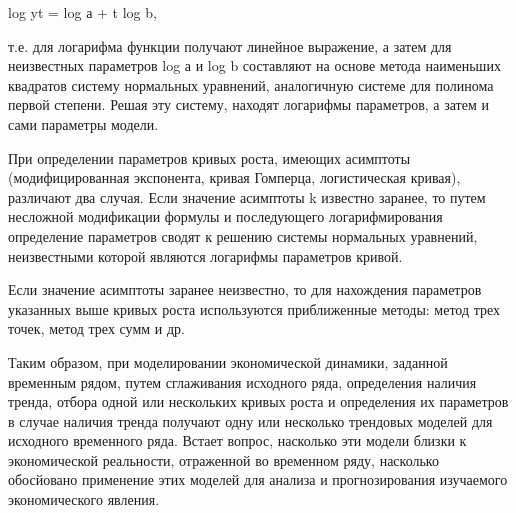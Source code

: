 log yt = log а + t log b,

т.е. для логарифма функции получают линейное выражение, а затем для неизвестных параметров log а и log b составляют на основе метода наименьших квадратов систему нормальных уравнений, аналогичную системе для полинома первой степени. Решая эту систему, находят логарифмы параметров, а затем и сами параметры модели.

При определении параметров кривых роста, имеющих асимптоты (модифицированная экспонента, кривая Гомперца, логистическая кривая), различают два случая. Если значение асимптоты k известно заранее, то путем несложной модификации формулы и последующего логарифмирования определение параметров сводят к решению системы нормальных уравнений, неизвестными которой являются логарифмы параметров кривой.

Если значение асимптоты заранее неизвестно, то для нахождения параметров указанных выше кривых роста используются приближенные методы: метод трех точек, метод трех сумм и др.

Таким образом, при моделировании экономической динамики, заданной временным рядом, путем сглаживания исходного ряда, определения наличия тренда, отбора одной или нескольких кривых роста и определения их параметров в случае наличия тренда получают одну или несколько трендовых моделей для исходного временного ряда. Встает вопрос, насколько эти модели близки к экономической реальности, отраженной во временном ряду, насколько обосйовано применение этих моделей для анализа и прогнозирования изучаемого экономического явления.


























